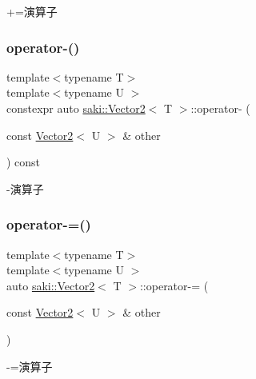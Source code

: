 +=演算子 

\mbox{\label{classsaki_1_1_vector2_a4be4c970957e552bdd98fa37ef4f14df}} 
\subsubsection{\texorpdfstring{operator-\/()}{operator-()}}
{\footnotesize\ttfamily template$<$typename T$>$ \\
template$<$typename U $>$ \\
constexpr auto \mbox{\hyperlink{classsaki_1_1_vector2}{saki\+::\+Vector2}}$<$ T $>$\+::operator-\/ (\begin{DoxyParamCaption}\item[{const \mbox{\hyperlink{classsaki_1_1_vector2}{Vector2}}$<$ U $>$ \&}]{other }\end{DoxyParamCaption}) const\hspace{0.3cm}{\ttfamily [inline]}}



-\/演算子 

\mbox{\label{classsaki_1_1_vector2_aaf222bfb3a2e02a1570ce2e90c41fdd0}} 
\subsubsection{\texorpdfstring{operator-\/=()}{operator-=()}}
{\footnotesize\ttfamily template$<$typename T$>$ \\
template$<$typename U $>$ \\
auto \mbox{\hyperlink{classsaki_1_1_vector2}{saki\+::\+Vector2}}$<$ T $>$\+::operator-\/= (\begin{DoxyParamCaption}\item[{const \mbox{\hyperlink{classsaki_1_1_vector2}{Vector2}}$<$ U $>$ \&}]{other }\end{DoxyParamCaption})\hspace{0.3cm}{\ttfamily [inline]}}



-\/=演算子 

\mbox{\label{classsaki_1_1_vector2_a1fb1f6ab6d21fcbc69624e99ab8ac5d2}} 
